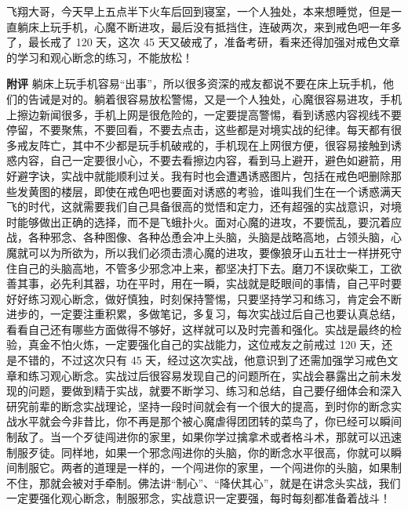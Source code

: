 \begin{case}
    飞翔大哥，今天早上五点半下火车后回到寝室，一个人独处，本来想睡觉，但是一直躺床上玩手机，心魔不断进攻，最后没有抵挡住，连破两次，来到戒色吧一年多了，最长戒了 120 天，这次 45 天又破戒了，准备考研，看来还得加强对戒色文章的学习和观心断念的练习，不能放松！

    \textbf{附评} 躺床上玩手机容易“出事”，所以很多资深的戒友都说不要在床上玩手机，他们的告诫是对的。躺着很容易放松警惕，又是一个人独处，心魔很容易进攻，手机上擦边新闻很多，手机上网是很危险的，一定要提高警惕，看到诱惑内容视线不要停留，不要聚焦，不要回看，不要去点击，这些都是对境实战的纪律。每天都有很多戒友阵亡，其中不少都是玩手机破戒的，手机现在上网很方便，很容易接触到诱惑内容，自己一定要很小心，不要去看擦边内容，看到马上避开，避色如避箭，用好避字诀，实战中就能顺利过关。我有时也会遭遇诱惑图片，包括在戒色吧删除那些发黄图的楼层，即使在戒色吧也要面对诱惑的考验，谁叫我们生在一个诱惑满天飞的时代，这就需要我们自己具备很高的觉悟和定力，还有超强的实战意识，对境时能够做出正确的选择，而不是飞蛾扑火。面对心魔的进攻，不要慌乱，要沉着应战，各种邪念、各种图像、各种怂恿会冲上头脑，头脑是战略高地，占领头脑，心魔就可以为所欲为，所以我们必须击溃心魔的进攻，要像狼牙山五壮士一样拼死守住自己的头脑高地，不管多少邪念冲上来，都坚决打下去。磨刀不误砍柴工，工欲善其事，必先利其器，功在平时，用在一瞬，实战就是眨眼间的事情，自己平时要好好练习观心断念，做好慎独，时刻保持警惕，只要坚持学习和练习，肯定会不断进步的，一定要注重积累，多做笔记，多复习，每次实战过后自己也要认真总结，看看自己还有哪些方面做得不够好，这样就可以及时完善和强化。实战是最终的检验，真金不怕火炼，一定要强化自己的实战能力，这位戒友之前戒过 120 天，还是不错的，不过这次只有 45 天，经过这次实战，他意识到了还需加强学习戒色文章和练习观心断念。实战过后很容易发现自己的问题所在，实战会暴露出之前未发现的问题，要做到精于实战，就要不断学习、练习和总结，自己要仔细体会和深入研究前辈的断念实战理论，坚持一段时间就会有一个很大的提高，到时你的断念实战水平就会今非昔比，你不再是那个被心魔虐得团团转的菜鸟了，你已经可以瞬间制敌了。当一个歹徒闯进你的家里，如果你学过擒拿术或者格斗术，那就可以迅速制服歹徒。同样地，如果一个邪念闯进你的头脑，你的断念水平很高，你就可以瞬间制服它。两者的道理是一样的，一个闯进你的家里，一个闯进你的头脑，如果制不住，那就会被对手牵制。佛法讲“制心”、“降伏其心”，就是在讲念头实战，我们一定要强化观心断念，制服邪念，实战意识一定要强，每时每刻都准备着战斗！
\end{case}

